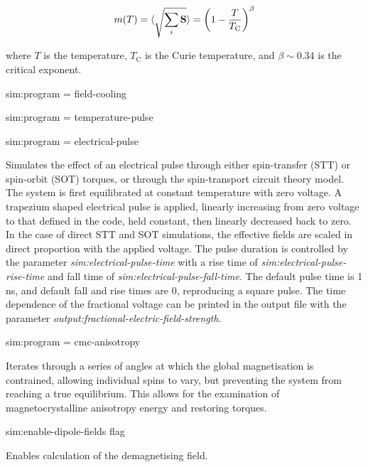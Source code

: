 \begin{equation}
m(T) = \langle{\sqrt{\sum_i \mathbf{S}}}\rangle = \left(1 - \frac{T}{T_{\mathrm{C}}} \right)^{\beta}
\end{equation}

\noindent where $T$ is the temperature, $T_{\mathrm{C}}$ is the Curie temperature, and $\beta \sim 0.34$ is the critical exponent.

{\zicf sim:program = field-cooling}

{\zicf sim:program = temperature-pulse}

{\zicf sim:program = electrical-pulse}
Simulates the effect of an electrical pulse through either spin-transfer (STT) or
spin-orbit (SOT) torques, or through the spin-transport circuit theory model. The
system is first equilibrated at constant temperature with zero voltage. A
trapezium shaped electrical pulse is applied, linearly increasing from zero
voltage to that defined in the code, held constant, then linearly decreased back
to zero. In the case of direct STT and SOT simulations, the effective fields are
scaled in direct proportion with the applied voltage. The pulse duration is
controlled by the parameter \textit{sim:electrical-pulse-time}
with a rise time of \textit{sim:electrical-pulse-rise-time} and fall time of
\textit{sim:electrical-pulse-fall-time}. The default pulse time is 1 ns, and
default fall and rise times are 0, reproducing a square pulse. The time
dependence of the fractional voltage can be printed in the output file with the
parameter \textit{output:fractional-electric-field-strength}.

{\zicf sim:program = cmc-anisotropy} Iterates through a series of angles at which the global magnetisation is contrained, allowing individual spins to vary, but preventing the system from reaching a true equilibrium. This allows for the examination of magnetocrystalline anisotropy energy and restoring torques.

{\zicf sim:enable-dipole-fields flag} Enables calculation of the demagnetising field.

